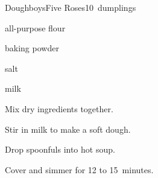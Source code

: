 \begin{recipe}{Doughboys}{Five Roses}{10~dumplings}

\begin{ingredients}
\item {} all-purpose flour
\item {} baking powder
\item \tp{\half} salt
\item \C{\half} milk
\end{ingredients}

\begin{directions}
\item Mix dry ingredients together.
\item Stir in milk to make a soft dough.
\item Drop spoonfuls into hot soup.
\item Cover and simmer for 12 to 15~minutes.
\end{directions}

\end{recipe}
